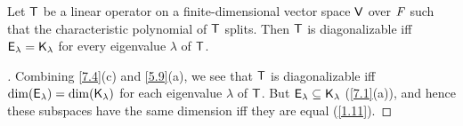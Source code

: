 \begin{cor}\label{7.1.5}
  Let \(\mathsf{T}\) be a linear operator on a finite-dimensional vector space \(\mathsf{V}\) over \(\mathit{F}\) such that the characteristic polynomial of \(\mathsf{T}\) splits.
  Then \(\mathsf{T}\) is diagonalizable iff \(\mathsf{E}_{\lambda} = \mathsf{K}_{\lambda}\) for every eigenvalue \(\lambda\) of \(\mathsf{T}\).
\end{cor}

\begin{proof}[]
  Combining \cref{7.4}(c) and \cref{5.9}(a), we see that \(\mathsf{T}\) is diagonalizable iff \(\dim(\mathsf{E}_{\lambda}) = \dim(\mathsf{K}_{\lambda})\) for each eigenvalue \(\lambda\) of \(\mathsf{T}\).
  But \(\mathsf{E}_{\lambda} \subseteq \mathsf{K}_{\lambda}\) (\cref{7.1}(a)), and hence these subspaces have the same dimension iff they are equal (\cref{1.11}).
\end{proof}
